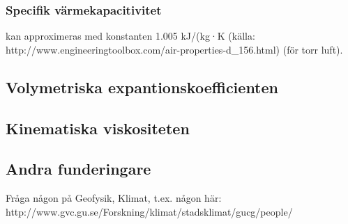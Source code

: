 \subsubsection{Specifik värmekapacitivitet}
kan approximeras med konstanten 1.005 kJ/(kg·K (källa: http://www.engineeringtoolbox.com/air-properties-d\_156.html) (för torr luft).

\subsection{Volymetriska expantionskoefficienten}

\subsection{Kinematiska viskositeten}

\subsection{Andra funderingare}
Fråga någon på Geofysik, Klimat, t.ex. någon här: http://www.gvc.gu.se/Forskning/klimat/stadsklimat/gucg/people/





